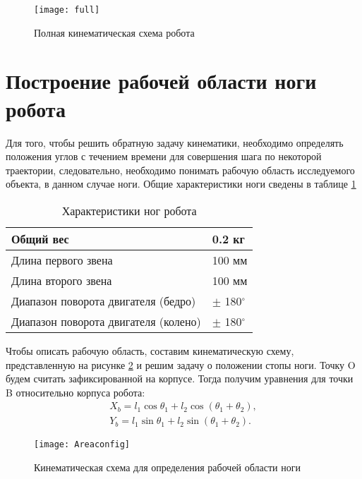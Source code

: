 \begin{figure}[h!]
	\begin{center}
		\texttt{[image: full]}
		\caption{Полная кинематическая схема робота}
		\label{full}
	\end{center}
\end{figure}

\section{Построение рабочей области ноги робота}\label{C2_2}
Для того, чтобы решить обратную задачу кинематики, необходимо определять положения углов с течением времени для совершения шага по некоторой траектории, следовательно, необходимо понимать рабочую область исследуемого объекта, в данном случае ноги. Общие характеристики ноги сведены в таблице \ref{tablParam}


\begin{table}[h]
	\begin{center}
		\caption{Характеристики ног робота}
		\label{tablParam}
		\begin{tabular}{| l | l |}
			\hline
			Общий вес   &    0.2 кг \\ \hline
			Длина первого звена & 100 мм\\ \hline
			Длина второго звена & 100 мм \\ \hline
			Диапазон поворота двигателя (бедро) & $\pm$ 180$^{\circ}$ \\ \hline
			Диапазон поворота двигателя (колено) & $\pm$ 180$^{\circ}$ \\ \hline
		\end{tabular}
	\end{center}
\end{table}

Чтобы описать рабочую область, составим кинематическую схему, представленную на рисунке \ref{Areaconfig} и решим задачу о положении стопы ноги. Точку O будем считать зафиксированной на корпусе. 
\newline
Тогда получим уравнения для точки B относительно корпуса робота:
\begin{equation}
\begin{array}{l}
	X_{b} = l_{1}\cos{\theta_1}+l_{2}\cos({\theta_1+\theta_2}),
	\\
	Y_{b} = l_{1}\sin{\theta_1}+l_{2}\sin({\theta_1+\theta_2}).
\end{array}
\end{equation}

\begin{figure}[h]
	\begin{center}
		\texttt{[image: Areaconfig]}
		\caption{Кинематическая схема для определения рабочей области ноги}
		\label{Areaconfig}
	\end{center}
\end{figure}

